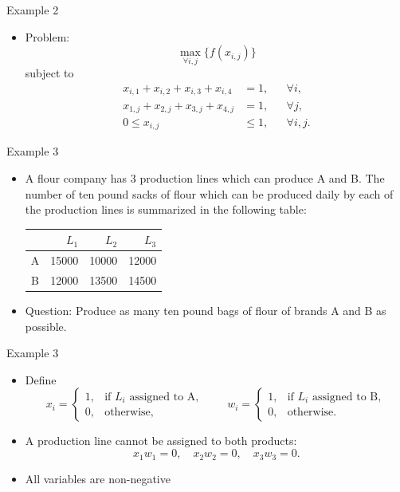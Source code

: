 \documentclass[aspectratio=169,hyperref,UTF8,CJK]{beamer}
\begin{document}
\begin{frame}{Example 2}
  \begin{itemize}
    \item Problem:
      \begin{equation*}
        \max_{\forall i,j}\{f(x_{i,j})\}
      \end{equation*}
      subject to
      \begin{align*}
        x_{i,1}+x_{i,2}+x_{i,3}+x_{i,4}&=1, &&\forall i,\\
        x_{1,j}+x_{2,j}+x_{3,j}+x_{4,j}&=1, &&\forall j,\\
        0\le x_{i,j}&\le1, &&\forall i,j.
      \end{align*}
  \end{itemize}
\end{frame}

\begin{frame}{Example 3}
  \small
  \begin{itemize}
    \item A flour company has 3 production lines which can produce A and B. The number of ten pound sacks of flour which can be produced daily by each of the production lines is summarized in the following table:
      \begin{center}
        \begin{tabular}{c|rrr}
          & $L_1$ & $L_2$ & $L_3$\\ \hline
          A & 15000 & 10000 & 12000\\
          B & 12000 & 13500 & 14500
        \end{tabular}
      \end{center}
    \item Question: Produce as many ten pound bags of flour of brands A and B as possible.
  \end{itemize}
\end{frame}

\begin{frame}{Example 3}
  \small
  \begin{itemize}
    \item Define
      \begin{equation*}
        x_i=\begin{cases}1,&\text{if $L_i$ assigned to A},\\0,&\text{otherwise,}\end{cases}
        \qquad
        w_i=\begin{cases}1,&\text{if $L_i$ assigned to B},\\0,&\text{otherwise.}\end{cases}
      \end{equation*}
    \item A production line cannot be assigned to both products:
      \begin{equation*}
        x_1w_1=0,\quad x_2w_2=0,\quad x_3w_3=0.
      \end{equation*}
    \item All variables are non-negative
  \end{itemize}
\end{frame}
\end{document}
